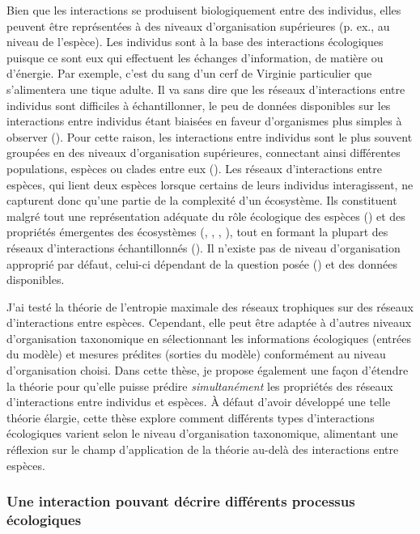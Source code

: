 Bien que les interactions se produisent biologiquement entre des
individus, elles peuvent être représentées à des niveaux d'organisation
supérieures (p. ex., au niveau de l'espèce). Les individus sont à la base des
interactions écologiques puisque ce sont eux qui effectuent les échanges
d'information, de matière ou d'énergie. Par exemple, c'est du sang d'un cerf de
Virginie particulier que s'alimentera une tique adulte. Il va sans dire que les
réseaux d'interactions entre individus sont difficiles à échantillonner, le peu
de données disponibles sur les interactions entre individus étant biaisées en
faveur d'organismes plus simples à observer (\cite{Guimaraes2020Structure}).
Pour cette raison, les interactions entre individus sont le plus souvent
groupées en des niveaux d'organisation supérieures, connectant ainsi différentes
populations, espèces ou clades entre eux (\cite{Elton1927Animal}). Les réseaux
d'interactions entre espèces, qui lient deux espèces lorsque certains de leurs
individus interagissent, ne capturent donc qu'une partie de la complexité d'un
écosystème. Ils constituent malgré tout une représentation adéquate du rôle
écologique des espèces (\cite{Delmas2019Analysing}) et des propriétés émergentes
des écosystèmes (\cite{Loreau2010Populations}, \cite{McCann2011Food},
\cite{Bascompte2013Mutualistic}, \cite{Gonzalez2020Scalingup}), tout en formant
la plupart des réseaux d'interactions échantillonnés
(\cite{Guimaraes2020Structure}). Il n'existe pas de niveau d'organisation
approprié par défaut, celui-ci dépendant de la question posée
(\cite{Niquil2020Shifting}) et des données disponibles.

J'ai testé la théorie de l'entropie maximale des réseaux trophiques sur des
réseaux d'interactions entre espèces. Cependant, elle peut être adaptée à
d'autres niveaux d'organisation taxonomique en sélectionnant les informations
écologiques (entrées du modèle) et mesures prédites (sorties du modèle)
conformément au niveau d'organisation choisi. Dans cette thèse, je propose
également une façon d'étendre la théorie pour qu'elle puisse prédire
\textit{simultanément} les propriétés des réseaux d'interactions entre individus
et espèces. À défaut d'avoir développé une telle théorie élargie, cette thèse
explore comment différents types d'interactions écologiques varient selon le
niveau d'organisation taxonomique, alimentant une réflexion sur le champ
d'application de la théorie au-delà des interactions entre espèces. 

\subsubsection{Une interaction pouvant décrire différents processus écologiques} 

